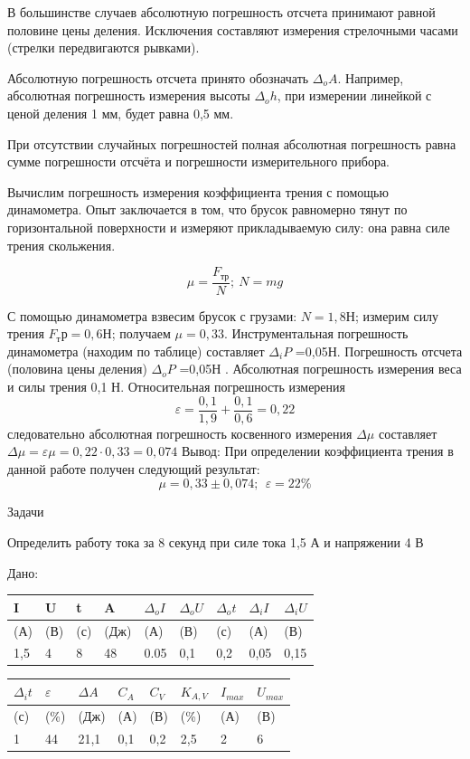 \documentclass[a5paper, 10pt]{diss_4}
\renewcommand{\'}{\,'}
\begin{document}
 В большинстве случаев абсолютную погрешность отсчета принимают равной
половине цены деления. Исключения составляют измерения стрелочными часами
(стрелки передвигаются рывками).

  Абсолютную погрешность отсчета принято обозначать $\Delta_o A$. Например,
абсолютная погрешность измерения высоты $\Delta_o h$, при измерении линейкой
с ценой деления 1 мм, будет равна 0,5 мм.

 При отсутствии случайных погрешностей полная абсолютная погрешность равна
сумме погрешности отсчёта и погрешности измерительного прибора.

 Вычислим погрешность измерения коэффициента трения с помощью динамометра.
Опыт заключается в том, что брусок равномерно тянут по горизонтальной
поверхности и измеряют прикладываемую силу: она равна силе трения скольжения.

\[\mu=\frac{F_{тр}}{N}; \ N=mg\]


  С помощью динамометра взвесим брусок с грузами: $N=1,8Н$; измерим силу
трения $F_тр=0,6Н$; получаем $\mu=0,33$. Инструментальная погрешность
динамометра (находим по таблице) составляет $\Delta_i P$ =0,05Н. Погрешность
отсчета (половина цены деления) $\Delta_o P$ =0,05Н . Абсолютная погрешность
измерения веса и силы трения 0,1 Н. Относительная погрешность измерения
\[\varepsilon=\frac{0,1}{1,9}+\frac{0,1}{0,6}=0,22\] следовательно абсолютная
погрешность косвенного измерения $\Delta\mu$ составляет
$\Delta\mu=\varepsilon\mu=0,22\cdot0,33=0,074$ Вывод: При определении коэффициента
 трения в данной работе получен следующий результат: \[\mu=0,33\pm0,074;\ \
\varepsilon=22\%\]

\begin{center}
   Задачи
\end{center}


Определить работу тока за 8 секунд при силе тока 1,5 А и напряжении 4 В

Дано:
\begin{center}
\begin{tabular}[c]{l|l|l|l|l|l|l|l|l}
I & U & t & A & $\Delta_o I$ & $\Delta_o U$ & $\Delta_o t$ &
$\Delta_i I$ & $\Delta_i U$
\\ \hline
(А) & (В) & (с) & (Дж) & (А) & (В) & (с) & (А) & (В)
\\ \hline
1,5 & 4 & 8 & 48 & 0.05 & 0,1 & 0,2 & 0,05 & 0,15
\end{tabular}

\begin{tabular}[c]{l|l|l|l|l|l|l|l}
$\Delta_i t$ & $\varepsilon$ & $\Delta A$
& ${C_A}$ & ${C_V}$ & ${K_{A,V}}$ & ${I_{max}}$ & ${U_{max}}$\\ \hline
(с) & (\%) & (Дж) & (А) & (В) & (\%) & (А) & (В) \\ \hline
1 & 44 & 21,1 & 0,1 & 0,2 & 2,5 & 2 & 6 \\
\end{tabular}
\end{center}
\end{document}
